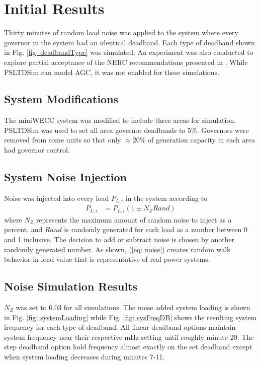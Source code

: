 \section{Initial Results}
Thirty minutes of random load noise was applied to the system where every governor in the system had an identical deadband.
Each type of deadband shown in Fig. \ref{fig: deadbandType} was simulated.
An experiment was also conducted to explore partial acceptance of the NERC recommendations presented in \cite{nercFRI2012}.
While PSLTDSim can model AGC, it was not enabled for these simulations.


\subsection{System Modifications}
The miniWECC system was modified to include three areas for simulation.
PSLTDSim was used to set all area governor deadbands to 5\%.
Governors were removed from some units so that only $\approx$20\% of generation capacity in each area had governor control.

\subsection{System Noise Injection}
Noise was injected into every load $P_{L,i}$ in the system according to
\begin{align}
P_{L,i} &= P_{L,i}(1 \pm N_Z Rand) \label{eq: noise}
\end{align}
where $N_Z$ represents the maximum amount of random noise to inject as a percent,
and $Rand$ is randomly generated for each load as a number between 0 and 1 inclusive.
The decision to add or subtract noise is chosen by another randomly generated number.
As shown, (\ref{eq: noise}) creates random walk behavior in load value that is representative of real power systems\cite{AGCCresap}.


\subsection{Noise Simulation Results}

$N_Z$ was set to 0.03 for all simulations. 
The noise added system loading is shown in Fig. \ref{fig: systemLoading} while Fig. \ref{fig: sysFreqDB} shows the resulting system frequency for each type of deadband.
All linear deadband options maintain system frequency near their respective mHz setting until roughly minute 20.
The step deadband option hold frequency almost exactly on the set deadband except when system loading decreases during minutes 7-11.


